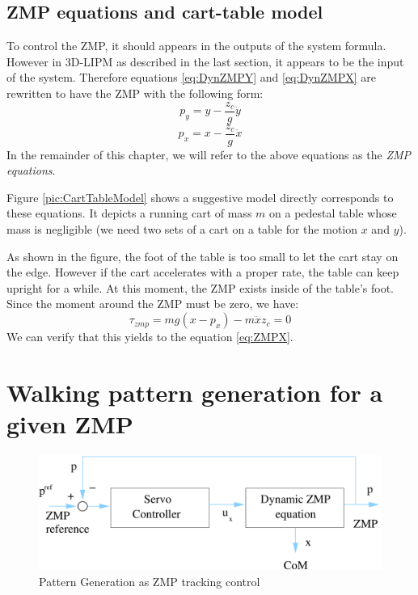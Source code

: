 \subsection{ZMP equations and cart-table model}
To control the ZMP, it should appears in the outputs of the system formula.
However in 3D-LIPM as described in the last section, it appears to 
be the input of the system. Therefore equations \ref{eq:DynZMPY} and \ref{eq:DynZMPX}
are rewritten to have the ZMP with the following form:
\begin{equation}
p_y = y - \frac{z_c}{g} \ddot{y} 
\label{eq:ZMPY}
\end{equation}
\begin{equation}
p_x = x - \frac{z_c}{g} \ddot{x} 
\label{eq:ZMPX}
\end{equation}
In the remainder of this chapter, we will refer to the above equations as the \textit{ZMP equations}.
\par
Figure \ref{pic:CartTableModel} shows a suggestive model directly corresponds to these equations.
It depicts a running cart of mass $m$ on a pedestal  table whose mass
is negligible (we need two sets of a cart on a table for the motion $x$ and $y$).
\par
As shown in the figure, the foot of the table is too small to let the cart stay on the edge.
However if the cart accelerates with a proper rate, the table can keep upright for
a while. At this moment, the ZMP exists inside of the table's foot.
Since the moment around the ZMP must be zero, we have:
\begin{equation}
\tau_{zmp} = mg(x-p_x) - m \ddot{x} z_c = 0
\end{equation}
We can verify that this yields to the equation \ref{eq:ZMPX}.

\section{Walking pattern generation for a given ZMP}
%
\begin{figure}[htb]
\begin{center}
\includegraphics[width=0.5\linewidth]{./figures/PatternGenerator/PatternGenerationAsZMPTrackingControl}
\caption{Pattern Generation as ZMP tracking control}
\label{pic:PatternGenerationAsZMPTrackingControl}
\end{center}
\end{figure}
%
